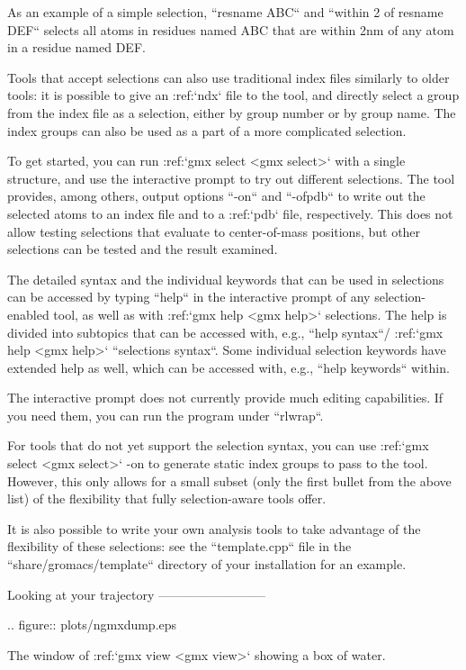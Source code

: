 As an example of a simple selection, ``resname ABC`` and
``within 2 of resname DEF`` selects all atoms in residues named ABC that are
within 2nm of any atom in a residue named DEF.

Tools that accept selections can also use traditional index files
similarly to older tools: it is possible to give an :ref:`ndx`
file to the tool, and directly select a group from the index file as a
selection, either by group number or by group name. The index groups can
also be used as a part of a more complicated selection.

To get started, you can run :ref:`gmx select <gmx select>` with a single
structure, and use the interactive prompt to try out different
selections. The tool provides, among others, output options
``-on`` and ``-ofpdb`` to write out the selected
atoms to an index file and to a :ref:`pdb` file, respectively.
This does not allow testing selections that evaluate to center-of-mass
positions, but other selections can be tested and the result examined.

The detailed syntax and the individual keywords that can be used in
selections can be accessed by typing ``help`` in the
interactive prompt of any selection-enabled tool, as well as with
:ref:`gmx help <gmx help>` selections. The help is divided into subtopics
that can be accessed with, e.g., ``help syntax``/
:ref:`gmx help <gmx help>` ``selections syntax``. Some individual selection
keywords have extended help as well, which can be accessed with, e.g.,
``help keywords`` within.

The interactive prompt does not currently provide much editing
capabilities. If you need them, you can run the program under
``rlwrap``.

For tools that do not yet support the selection syntax, you can use
:ref:`gmx select <gmx select>` -on to generate static index groups to pass
to the tool. However, this only allows for a small subset (only the
first bullet from the above list) of the flexibility that fully
selection-aware tools offer.

It is also possible to write your own analysis tools to take advantage
of the flexibility of these selections: see the
``template.cpp`` file in the
``share/gromacs/template`` directory of your installation
for an example.

Looking at your trajectory
--------------------------

.. figure:: plots/ngmxdump.eps

   The window of :ref:`gmx view <gmx view>` showing a box of water.

